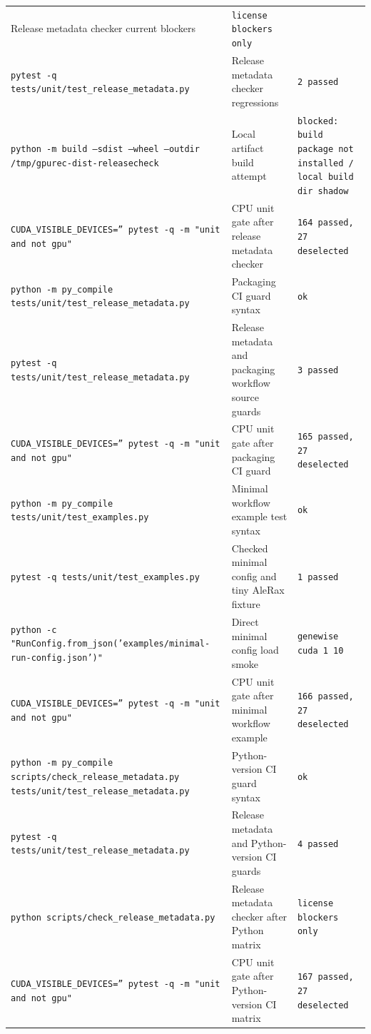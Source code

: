 \documentclass[11pt]{article}
\begin{document}
\begin{center}
\begin{tabular}{lll}
Release metadata checker current blockers &
\texttt{license blockers only} \\
\texttt{pytest -q tests/unit/test\_release\_metadata.py} &
Release metadata checker regressions &
\texttt{2 passed} \\
\texttt{python -m build --sdist --wheel --outdir /tmp/gpurec-dist-releasecheck} &
Local artifact build attempt &
\texttt{blocked: build package not installed / local build dir shadow} \\
\texttt{CUDA\_VISIBLE\_DEVICES='' pytest -q -m "unit and not gpu"} &
CPU unit gate after release metadata checker &
\texttt{164 passed, 27 deselected} \\
\texttt{python -m py\_compile tests/unit/test\_release\_metadata.py} &
Packaging CI guard syntax &
\texttt{ok} \\
\texttt{pytest -q tests/unit/test\_release\_metadata.py} &
Release metadata and packaging workflow source guards &
\texttt{3 passed} \\
\texttt{CUDA\_VISIBLE\_DEVICES='' pytest -q -m "unit and not gpu"} &
CPU unit gate after packaging CI guard &
\texttt{165 passed, 27 deselected} \\
\texttt{python -m py\_compile tests/unit/test\_examples.py} &
Minimal workflow example test syntax &
\texttt{ok} \\
\texttt{pytest -q tests/unit/test\_examples.py} &
Checked minimal config and tiny AleRax fixture &
\texttt{1 passed} \\
\texttt{python -c "RunConfig.from\_json('examples/minimal-run-config.json')"} &
Direct minimal config load smoke &
\texttt{genewise cuda 1 10} \\
\texttt{CUDA\_VISIBLE\_DEVICES='' pytest -q -m "unit and not gpu"} &
CPU unit gate after minimal workflow example &
\texttt{166 passed, 27 deselected} \\
\texttt{python -m py\_compile scripts/check\_release\_metadata.py tests/unit/test\_release\_metadata.py} &
Python-version CI guard syntax &
\texttt{ok} \\
\texttt{pytest -q tests/unit/test\_release\_metadata.py} &
Release metadata and Python-version CI guards &
\texttt{4 passed} \\
\texttt{python scripts/check\_release\_metadata.py} &
Release metadata checker after Python matrix &
\texttt{license blockers only} \\
\texttt{CUDA\_VISIBLE\_DEVICES='' pytest -q -m "unit and not gpu"} &
CPU unit gate after Python-version CI matrix &
\texttt{167 passed, 27 deselected} \\

\end{tabular}
\end{center}
\end{document}
